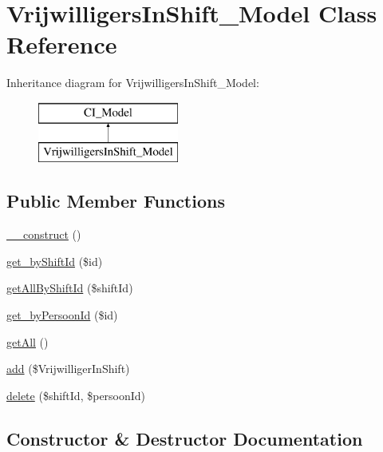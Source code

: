\hypertarget{class_vrijwilligers_in_shift___model}{}\section{Vrijwilligers\+In\+Shift\+\_\+\+Model Class Reference}
\label{class_vrijwilligers_in_shift___model}
Inheritance diagram for Vrijwilligers\+In\+Shift\+\_\+\+Model\+:\begin{figure}[H]
\begin{center}
\leavevmode
\includegraphics[height=2.000000cm]{class_vrijwilligers_in_shift___model}
\end{center}
\end{figure}
\subsection*{Public Member Functions}
\begin{DoxyCompactItemize}
\item 
\mbox{\hyperlink{class_vrijwilligers_in_shift___model_a095c5d389db211932136b53f25f39685}{\+\_\+\+\_\+construct}} ()
\item 
\mbox{\hyperlink{class_vrijwilligers_in_shift___model_a55c8d969239cd8c2f167b004ec886514}{get\+\_\+by\+Shift\+Id}} (\$id)
\item 
\mbox{\hyperlink{class_vrijwilligers_in_shift___model_a35126fd2943dda2b4d2d9ad9b6ca127f}{get\+All\+By\+Shift\+Id}} (\$shift\+Id)
\item 
\mbox{\hyperlink{class_vrijwilligers_in_shift___model_aa04bd86e024fed6b73b051c9cbb9ec52}{get\+\_\+by\+Persoon\+Id}} (\$id)
\item 
\mbox{\hyperlink{class_vrijwilligers_in_shift___model_aba0d5b303383fb5b1fabb5fd01cd3800}{get\+All}} ()
\item 
\mbox{\hyperlink{class_vrijwilligers_in_shift___model_ad5245963891f83f9da52a0b71d1a573f}{add}} (\$Vrijwilliger\+In\+Shift)
\item 
\mbox{\hyperlink{class_vrijwilligers_in_shift___model_a0b51c4f3d41dcc04514f7ea8405f4ed3}{delete}} (\$shift\+Id, \$persoon\+Id)
\end{DoxyCompactItemize}


\subsection{Constructor \& Destructor Documentation}
\mbox{\label{class_vrijwilligers_in_shift___model_a095c5d389db211932136b53f25f39685}} 
